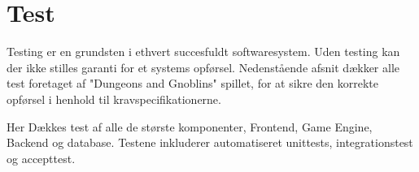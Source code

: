 \section{Test}
Testing er en grundsten i ethvert succesfuldt softwaresystem. Uden testing kan
der ikke stilles garanti for et systems opførsel. Nedenstående afsnit dækker
alle test foretaget af "Dungeons and Gnoblins" spillet, for at sikre den korrekte
opførsel i henhold til kravspecifikationerne.

Her Dækkes test af alle de største komponenter, Frontend, Game Engine, Backend og
database. Testene inkluderer automatiseret unittests, integrationstest og accepttest.




